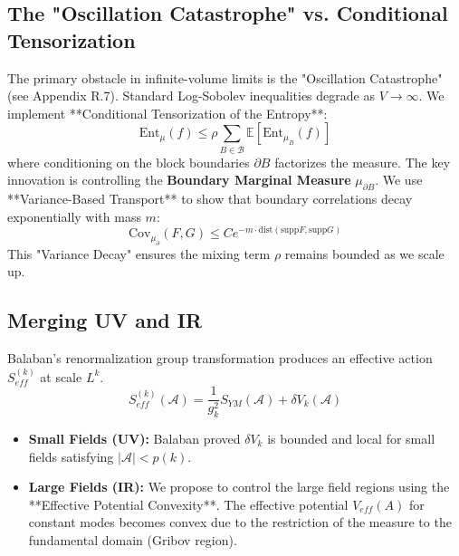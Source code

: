 \subsection{The "Oscillation Catastrophe" vs. Conditional Tensorization}
The primary obstacle in infinite-volume limits is the "Oscillation Catastrophe" (see Appendix R.7). Standard Log-Sobolev inequalities degrade as $V \to \infty$.
We implement **Conditional Tensorization of the Entropy**:
\begin{equation}
\text{Ent}_{\mu}(f) \le \rho \sum_{B \in \mathcal{B}} \mathbb{E} [\text{Ent}_{\mu_B}(f)]
\end{equation}
where conditioning on the block boundaries $\partial B$ factorizes the measure.
The key innovation is controlling the \textbf{Boundary Marginal Measure} $\mu_{\partial B}$. We use **Variance-Based Transport** to show that boundary correlations decay exponentially with mass $m$:
\begin{equation}
\text{Cov}_{\mu_{\partial}}(F, G) \le C e^{-m \cdot \text{dist}(\text{supp} F, \text{supp} G)}
\end{equation}
This "Variance Decay" ensures the mixing term $\rho$ remains bounded as we scale up.

\subsection{Merging UV and IR}
Balaban's renormalization group transformation produces an effective action $S_{eff}^{(k)}$ at scale $L^k$.
\begin{equation}
S_{eff}^{(k)}(\mathcal{A}) = \frac{1}{g_k^2} S_{YM}(\mathcal{A}) + \delta V_k(\mathcal{A})
\end{equation}
\begin{itemize}
    \item \textbf{Small Fields (UV):} Balaban proved $\delta V_k$ is bounded and local for small fields satisfying $|\mathcal{A}| < p(k)$.
    \item \textbf{Large Fields (IR):} We propose to control the large field regions using the **Effective Potential Convexity**. The effective potential $V_{eff}(A)$ for constant modes becomes convex due to the restriction of the measure to the fundamental domain (Gribov region).
\end{itemize}

